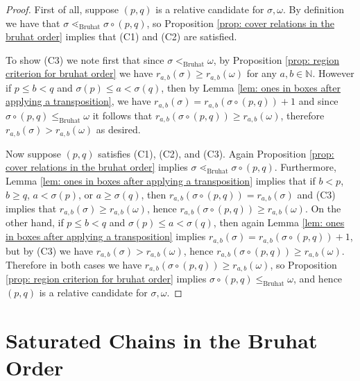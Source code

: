 \documentclass[oneside,11pt,reqno]{amsart}
\newcommand{\nn}{\ensuremath{\mathbb{N}}}
\theoremstyle{definition}
\newtheorem{proof techniques}{Proof Techniques}
\begin{document}
\begin{proof}
First of all, suppose $(p , q)$ is a relative candidate for $\sigma , \omega$. By definition we have that $\sigma \lessdot_\text{Bruhat} \sigma \circ (p , q)$, so Proposition \ref{prop: cover relations in the bruhat order} implies that (C1) and (C2) are satisfied. 

To show (C3) we note first that since $\sigma <_\text{Bruhat} \omega$, by Proposition \ref{prop: region criterion for bruhat order} we have $r_{a , b}(\sigma) \geq r_{a , b}(\omega)$ for any $a , b \in \nn$. However if $p \leq b < q$ and $\sigma(p) \leq a < \sigma(q)$, then by Lemma \ref{lem: ones in boxes after applying a transposition}, we have $r_{a , b}(\sigma) = r_{a , b}(\sigma \circ (p , q)) + 1$ and since $\sigma \circ (p , q) \leq_\text{Bruhat} \omega$ it follows that $r_{a , b}(\sigma \circ (p , q)) \geq r_{a , b}(\omega)$, therefore $r_{a , b}(\sigma) > r_{a , b}(\omega)$ as desired. 

Now suppose $(p , q)$ satisfies (C1), (C2), and (C3). Again Proposition \ref{prop: cover relations in the bruhat order} implies $\sigma \lessdot_{\text{Bruhat}} \sigma \circ (p , q)$. Furthermore, Lemma \ref{lem: ones in boxes after applying a transposition} implies that if $b < p$, $b \geq q$, $a < \sigma(p)$, or $a \geq \sigma(q)$, then $r_{a , b}(\sigma \circ (p , q)) = r_{a , b}(\sigma)$ and (C3) implies that $r_{a , b}(\sigma) \geq r_{ a , b}(\omega)$, hence $r_{a , b}(\sigma \circ (p , q)) \geq r_{ a , b}(\omega)$. On the other hand, if $p \leq b < q$ and $\sigma(p) \leq a < \sigma(q)$, then again Lemma \ref{lem: ones in boxes after applying a transposition} implies $r_{a , b}(\sigma) = r_{a , b}(\sigma \circ (p , q)) + 1$, but by (C3) we have $r_{a , b}(\sigma) > r_{a , b}(\omega)$, hence $r_{a , b}(\sigma \circ (p , q)) \geq r_{a , b}(\omega)$. Therefore in both cases we have $r_{a , b}(\sigma \circ (p , q)) \geq r_{a , b}(\omega)$, so Proposition \ref{prop: region criterion for bruhat order} implies $\sigma \circ (p , q) \leq_\text{Bruhat} \omega$, and hence $(p , q)$ is a relative candidate for $\sigma, \omega$. 
\end{proof}


\section{Saturated Chains in the Bruhat Order}\label{sec: discrete-saturated Chains in the Bruhat Order}
\end{document}
